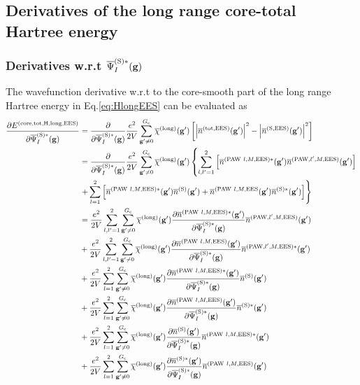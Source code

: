\documentclass[paper=a4, fontsize=11pt]{article} %
\numberwithin{equation}{section} %
\numberwithin{figure}{section} %
\numberwithin{table}{section} %
\newcommand{\p}{\partial}
\newcommand{\ol}{\overline}
\newcommand{\bg}{{\bf{g}}}
\newcommand{\rS}{{\mathrm{S}}}
\newcommand{\rEES}{{\mathrm{EES}}}
\newcommand{\rcore}{{\mathrm{core}}}
\newcommand{\rlong}{{\mathrm{long}}}
\newcommand{\rP}{{\mathrm{PAW}}}
\newcommand{\rH}{{\mathrm{H}}}
\newcommand{\rtot}{{\mathrm{tot}}}
\newcommand{\psigsc}{{\overline \Psi_I^{(\rS)*}(\bg)}}
\newcommand{\Gc}{{G_{\mathrm{c}}}}
\begin{document}
\subsection{Derivatives of the long range core-total Hartree energy}
\subsubsection{Derivatives w.r.t $\psigsc$}
The wavefunction derivative w.r.t to the core-smooth part of the long range Hartree energy in Eq.\eqref{eq:HlongEES} can be evaluated as
\begin{equation}
\begin{split}
\frac{\p E^{(\rcore,\rtot,\rH,\rlong,\rEES)}}{\p \psigsc}
&= \frac{\p }{\p \psigsc}
 \frac{e^2}{2V} \sum_{\bg' \neq 0}^\Gc \ol \chi^{(\rlong)} (\bg')\left[\left|\ol{n}^{(\rtot,\rEES)}(\bg')\right|^2 - \left|\ol{n}^{(\rS,\rEES)}(\bg')\right|^2 \right] \\
 &= \frac{\p }{\p \psigsc}
 \frac{e^2}{2V} \sum_{\bg' \neq 0}^\Gc \ol \chi^{(\rlong)} (\bg') \left\{ \sum_{l,l'=1}^2 \left[ \ol{n}^{(\rP\ l,M,\rEES)*}(\bg')\ol{n}^{(\rP,l',M,\rEES)}(\bg') \right] \right. \\
 &\left. +\sum_{l=1}^2\left[ \ol{n}^{(\rP\ l,M,\rEES)*}(\bg')\ol{n}^{(\rS)}(\bg') + \ol{n}^{(\rP\ l,M,\rEES}(\bg')\ol{n}^{(\rS)*}(\bg')\right]\right\} \\
 &= \frac{e^2}{2V}  \sum_{l,l'=1}^2  \sum_{\bg' \neq 0}^{\Gc} \ol \chi^{(\rlong)} (\bg') \frac{\p \ol{n}^{(\rP\ l,M,\rEES)*}(\bg')}{\p \psigsc}\ol{n}^{(\rP,l',M,\rEES)}(\bg') \\ 
 &+ \frac{e^2}{2V}  \sum_{l,l'=1}^2  \sum_{\bg' \neq 0}^{\Gc} \ol \chi^{(\rlong)} (\bg') \frac{\p \ol{n}^{(\rP\ l,M,\rEES)}(\bg')}{\p \psigsc}\ol{n}^{(\rP,l',M,\rEES)*}(\bg') \\
 &+ \frac{e^2}{2V}  \sum_{l=1}^2 \sum_{\bg' \neq 0}^{\Gc} \ol \chi^{(\rlong)} (\bg') \frac{\p \ol{n}^{(\rP\ l,M,\rEES)*}(\bg')}{\p \psigsc}\ol{n}^{(\rS)}(\bg') \\
 &+ \frac{e^2}{2V}  \sum_{l=1}^2 \sum_{\bg' \neq 0}^{\Gc} \ol \chi^{(\rlong)} (\bg') \frac{\p \ol{n}^{(\rP\ l,M,\rEES)}(\bg')}{\p \psigsc}\ol{n}^{(\rS)*}(\bg') \\
&+ \frac{e^2}{2V}  \sum_{l=1}^2 \sum_{\bg' \neq 0}^{\Gc} \ol \chi^{(\rlong)} (\bg') \frac{\p \ol{n}^{(\rS)}(\bg')}{\p \psigsc}\ol{n}^{(\rP\ l,M,\rEES)*}(\bg') \\
&+ \frac{e^2}{2V}  \sum_{l=1}^2 \sum_{\bg' \neq 0}^{\Gc} \ol \chi^{(\rlong)} (\bg') \frac{\p \ol{n}^{(\rS)*}(\bg')}{\p \psigsc}\ol{n}^{(\rP\ l,M,\rEES)}(\bg') \\

\end{split}
\end{equation}
\end{document}
